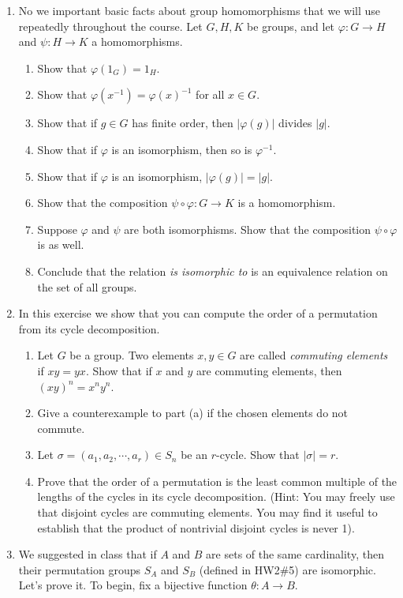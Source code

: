 \documentclass[11pt]{article}
\begin{document}
\begin{enumerate}
  \item No we important basic facts about group homomorphisms that we will use repeatedly throughout the course.  Let $G,H,K$ be groups, and let $\varphi:G\to H$ and $\psi:H\to K$ a homomorphisms.
  \begin{enumerate}
    \item Show that $\varphi(1_G) = 1_H$.
    \item Show that $\varphi(x^{-1}) = \varphi(x)^{-1}$ for all $x\in G$.
    \item Show that if $g\in G$ has finite order, then $|\varphi(g)|$ divides $|g|$.
    \item Show that if $\varphi$ is an isomorphism, then so is $\varphi^{-1}$.
    \item Show that if $\varphi$ is an isomorphism, $|\varphi(g)| = |g|$.
    \item Show that the composition $\psi\circ \varphi:G\to K$ is a homomorphism.
    \item Suppose $\varphi$ and $\psi$ are both isomorphisms.  Show that the composition $\psi\circ\varphi$ is as well.
    \item Conclude that the relation \textit{is isomorphic to} is an equivalence relation on the set of all groups.
    \end{enumerate}
  \item In this exercise we show that you can compute the order of a permutation from its cycle decomposition.
  \begin{enumerate}
    \item Let $G$ be a group.  Two elements $x,y\in G$ are called \textit{commuting elements} if $xy = yx$.  Show that if $x$ and $y$ are commuting elements, then $(xy)^n = x^ny^n$.
    \item Give a counterexample to part (a) if the chosen elements do not commute.
    \item Let $\sigma = (a_1,a_2,\cdots,a_r)\in S_n$ be an $r$-cycle.  Show that $|\sigma| = r$.
    \item Prove that the order of a permutation is the least common multiple of the lengths of the cycles in its cycle decomposition.  (Hint: You may freely use that disjoint cycles are commuting elements.  You may find it useful to establish that the product of nontrivial disjoint cycles is never 1).
  \end{enumerate}
  \item We suggested in class that if $A$ and $B$ are sets of the same cardinality, then their permutation groups $S_A$ and $S_B$ (defined in HW2\#5) are isomorphic.  Let's prove it.  To begin, fix a bijective function $\theta:A\to B$.

\end{enumerate}
\end{document}
